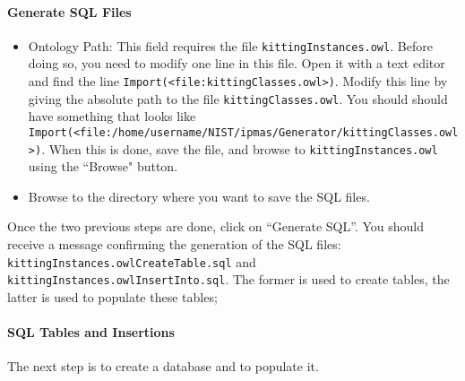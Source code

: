 \paragraph{Generate SQL Files}
\begin{itemize}
 \item Ontology Path: This field requires the file \texttt{kittingInstances.owl}. Before doing so, you need to modify one line in this file. Open it with a text editor and find the line \texttt{Import(<file:kittingClasses.owl>)}. Modify
this line by giving the absolute path to the file \texttt{kittingClasses.owl}. You should should have something that looks like \texttt{Import(<file:/home/username/NIST/ipmas/Generator/kittingClasses.owl>)}. When this is done, save the file, and browse to  \texttt{kittingInstances.owl} using the ``Browse" button.
 \item Browse to the directory where you want to save the SQL files.
\end{itemize}

Once the two previous steps are done, click on ``Generate SQL''. You should receive a message confirming the generation of the SQL files: \texttt{kittingInstances.owlCreateTable.sql} and \texttt{kittingInstances.owlInsertInto.sql}. The former is used to create tables, the latter is used to populate these tables;

\paragraph{SQL Tables and Insertions}
The next step is to create a database and to populate it.

